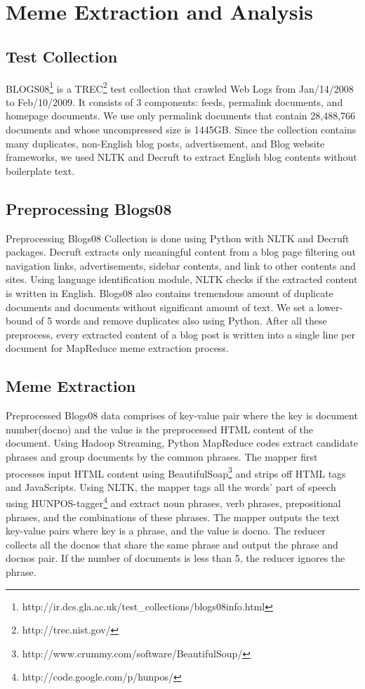 \documentclass{sig-alternate}
\begin{document}
\section{Meme Extraction and Analysis}

\subsection{Test Collection}

BLOGS08\footnote{http://ir.dcs.gla.ac.uk/test\_collections/blogs08info.html} is a TREC\footnote{http://trec.nist.gov/} test collection that crawled Web Logs from Jan/14/2008 to Feb/10/2009. It consists of 3 components: feeds, permalink documents, and homepage documents. We use only permalink documents that contain 28,488,766 documents and whose uncompressed size is 1445GB. Since the collection contains many duplicates, non-English blog posts, advertisement, and Blog website frameworks, we used NLTK and Decruft to extract English blog contents without boilerplate text.

\subsection{Preprocessing Blogs08}

Preprocessing Blogs08 Collection is done using Python with NLTK and Decruft packages. Decruft extracts only meaningful content from a blog page filtering out navigation links, advertisements, sidebar contents, and link to other contents and sites. Using language identification module, NLTK checks if the extracted content is written in English. Blogs08 also contains tremendous amount of duplicate documents and documents without significant amount of text. We set a lower-bound of 5 words and remove duplicates also using Python. After all these preprocess, every extracted content of a blog post is written into a single line per document for MapReduce meme extraction process.

\subsection{Meme Extraction}

Preprocessed Blogs08 data comprises of key-value pair where the key is document number(docno) and the value is the preprocessed HTML content of the document. Using Hadoop Streaming, Python MapReduce codes extract candidate phrases and group documents by the common phrases. The mapper first processes input HTML content using BeautifulSoap\footnote{http://www.crummy.com/software/BeautifulSoup/} and strips off HTML tags and JavaScripts. Using NLTK, the mapper tags all the words' part of speech using HUNPOS-tagger\footnote{http://code.google.com/p/hunpos/} and extract noun phrases, verb phrases, prepositional phrases, and the combinations of these phrases. The mapper outputs the text key-value pairs where key is a phrase, and the value is docno. The reducer collects all the docnos that share the same phrase and output the phrase and docnos pair. If the number of documents is less than 5, the reducer ignores the phrase.
\end{document}
